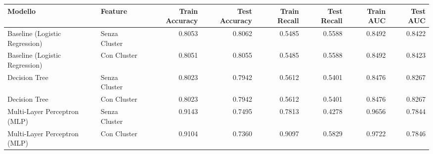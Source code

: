 \begin{tabular}{llrrrrrr}
\toprule
Modello & Feature & Train Accuracy & Test Accuracy & Train Recall & Test Recall & Train AUC & Test AUC \\
\midrule
Baseline (Logistic Regression) & Senza Cluster & 0.8053 & 0.8062 & 0.5485 & 0.5588 & 0.8492 & 0.8422 \\
Baseline (Logistic Regression) & Con Cluster & 0.8051 & 0.8055 & 0.5485 & 0.5588 & 0.8492 & 0.8423 \\
Decision Tree & Senza Cluster & 0.8023 & 0.7942 & 0.5612 & 0.5401 & 0.8476 & 0.8267 \\
Decision Tree & Con Cluster & 0.8023 & 0.7942 & 0.5612 & 0.5401 & 0.8476 & 0.8267 \\
Multi-Layer Perceptron (MLP) & Senza Cluster & 0.9143 & 0.7495 & 0.7813 & 0.4278 & 0.9656 & 0.7844 \\
Multi-Layer Perceptron (MLP) & Con Cluster & 0.9104 & 0.7360 & 0.9097 & 0.5829 & 0.9722 & 0.7846 \\
\bottomrule
\end{tabular}

